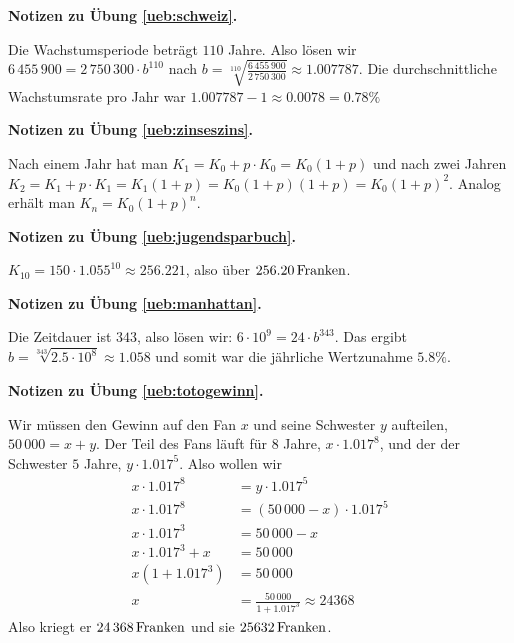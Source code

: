 \documentclass[%
11pt,%
twoside,%
titlepage,%
german,%
headsepline%
]{scrartcl}
\newcommand{\concatueb}[1]{ueb:#1}%
\newcommand{\concatlsg}[1]{lsg:#1}%
\newenvironment{lsg}[1]{%
    \par\noindent\textbf{Notizen zu Übung \ref{\concatueb{#1}}.}%
    \label{\concatlsg{#1}}
}{%
    \par%
}
\begin{document}
\begin{lsg}{schweiz}
    Die Wachstumsperiode beträgt $110$ Jahre. Also lösen wir $6\,455\,900=2\,750\,300\cdot b^{110}$ nach $b=\sqrt[110]{\frac{6\,455\,900}{2\,750\,300}}\approx1.007787$. Die durchschnittliche Wachstumsrate pro Jahr war $1.007787-1\approx0.0078=0.78\%$
\end{lsg}
\begin{lsg}{zinseszins}
    Nach einem Jahr hat man $K_1=K_0+p\cdot K_0=K_0(1+p)$ und nach zwei Jahren $K_2=K_1+p\cdot K_1=K_1(1+p)=K_0(1+p)(1+p)=K_0(1+p)^2$. Analog erhält man $K_n=K_0(1+p)^n$.
\end{lsg}
\begin{lsg}{jugendsparbuch}
    $K_{10}=150\cdot1.055^{10}\approx256.221$, also über $\unit[256.20]{Franken}$.
\end{lsg}
\begin{lsg}{manhattan}
    Die Zeitdauer ist $343$, also lösen wir: $6\cdot10^9=24\cdot b^{343}$. Das ergibt $b=\sqrt[343]{2.5\cdot10^8}\approx1.058$ und somit war die jährliche Wertzunahme $5.8\%$.
\end{lsg}
\begin{lsg}{totogewinn}
    Wir müssen den Gewinn auf den Fan $x$ und seine Schwester $y$ aufteilen, $50\,000=x+y$. Der Teil des Fans läuft für $8$ Jahre, $x\cdot 1.017^8$, und der der Schwester $5$ Jahre, $y\cdot 1.017^5$. Also wollen wir
    \begin{align*}
        x\cdot 1.017^8 &= y\cdot 1.017^5\\
        x\cdot 1.017^8 &= (50\,000-x)\cdot 1.017^5\tag{$\div1.017^5$}\\
        x\cdot 1.017^3 &= 50\,000-x\tag{$+x$}\\
        x\cdot 1.017^3+x &= 50\,000\tag{$+x$}\\
        x(1+1.017^3) &= 50\,000\tag{$\div(1+1.017^3)$}\\
        x &= \frac{50\,000}{1+1.017^3}\approx24368
    \end{align*}
    Also kriegt er $\unit[24\,368]{Franken}$ und sie $\unit[25632]{Franken}$.
\end{lsg}

\clearpage
\end{document}
